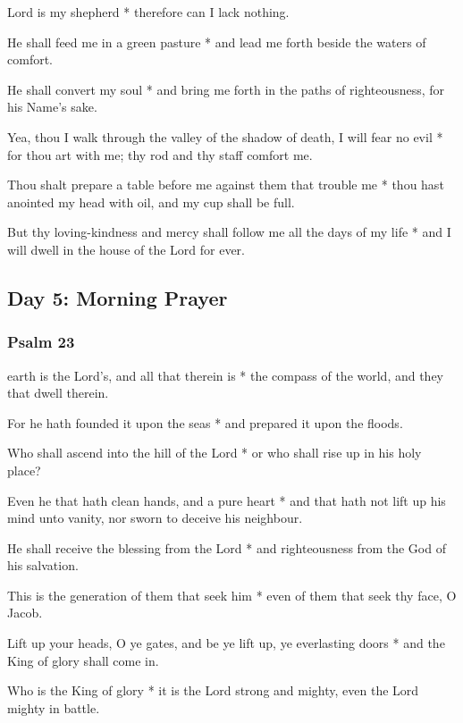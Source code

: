 
 Lord is my shepherd * therefore can I lack nothing.

He shall feed me in a green pasture * and lead me forth beside the waters of comfort.

He shall convert my soul * and bring me forth in the paths of righteousness, for his Name's sake.

Yea, thou I walk through the valley of the shadow of death, I will fear no evil * for thou art with me; thy rod and thy staff comfort me.

Thou shalt prepare a table before me against them that trouble me * thou hast anointed my head with oil, and my cup shall be full.

But thy loving-kindness and mercy shall follow me all the days of my life * and I will dwell in the house of the Lord for ever.

\subsection{Day 5: Morning Prayer}

\subsubsection{Psalm 23}


 earth is the Lord's, and all that therein is * the compass of the world, and they that dwell therein.

For he hath founded it upon the seas * and prepared it upon the floods.

Who shall ascend into the hill of the Lord * or who shall rise up in his holy place?

Even he that hath clean hands, and a pure heart * and that hath not lift up his mind unto vanity, nor sworn to deceive his neighbour.

He shall receive the blessing from the Lord * and righteousness from the God of his salvation.

This is the generation of them that seek him * even of them that seek thy face, O Jacob.

Lift up your heads, O ye gates, and be ye lift up, ye everlasting doors * and the King of glory shall come in.

Who is the King of glory * it is the Lord strong and mighty, even the Lord mighty in battle.

